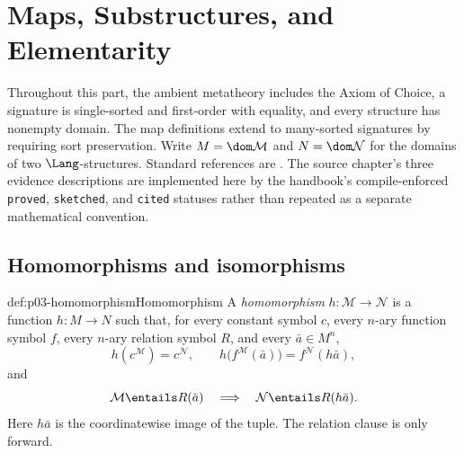 
\chapter{Maps, Substructures, and Elementarity}
\label{sec:p03-maps-elementarity}

Throughout this part, the ambient metatheory includes the Axiom of Choice, a
signature is single-sorted and first-order with equality, and every structure
has nonempty domain.  The map definitions extend to many-sorted signatures by
requiring sort preservation.  Write \(M=\dom\mathcal M\) and
\(N=\dom\mathcal N\) for the domains of two \(\Lang\)-structures.  Standard
references are \cite{ChangKeisler1990,Hodges1993,Marker2002}.  The source
chapter's three evidence descriptions are implemented here by the handbook's
compile-enforced \texttt{proved}, \texttt{sketched}, and \texttt{cited}
statuses rather than repeated as a separate mathematical convention.

\section{Homomorphisms and isomorphisms}
\label{sec:p03-map-notions}

\begin{hbdefinition}{def:p03-homomorphism}{Homomorphism}
A \emph{homomorphism} \(h:\mathcal M\to\mathcal N\) is a function \(h:M\to N\)
such that, for every constant symbol \(c\), every \(n\)-ary function symbol
\(f\), every \(n\)-ary relation symbol \(R\), and every \(\bar a\in M^n\),
\[
 h(c^{\mathcal M})=c^{\mathcal N},\qquad
 h\bigl(f^{\mathcal M}(\bar a)\bigr)=f^{\mathcal N}(h\bar a),
\]
and
\[
 \mathcal M\entails R(\bar a)
 \quad\Longrightarrow\quad
 \mathcal N\entails R(h\bar a).
\]
Here \(h\bar a\) is the coordinatewise image of the tuple.  The relation
clause is only forward.
\end{hbdefinition}

